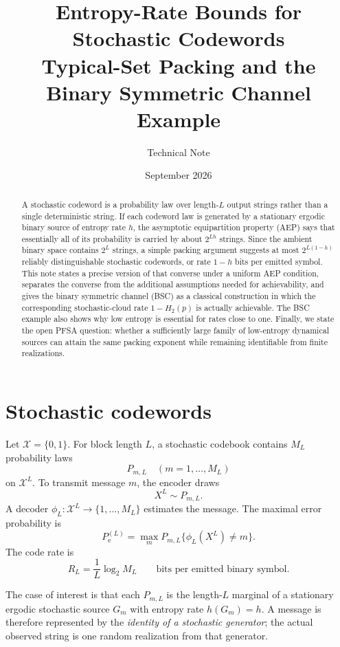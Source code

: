 \documentclass[11pt]{article}
\title{Entropy-Rate Bounds for Stochastic Codewords\\\large Typical-Set Packing and the Binary Symmetric Channel Example}
\author{Technical Note}
\date{September 2026}
\newcommand{\X}{\mathcal{X}}
\newcommand{\Pe}{P_{\mathrm e}}
\begin{document}
\maketitle

\begin{abstract}
A stochastic codeword is a probability law over length-$L$ output strings rather than a single deterministic string.  If each codeword law is generated by a stationary ergodic binary source of entropy rate $h$, the asymptotic equipartition property (AEP) says that essentially all of its probability is carried by about $2^{Lh}$ strings.  Since the ambient binary space contains $2^L$ strings, a simple packing argument suggests at most $2^{L(1-h)}$ reliably distinguishable stochastic codewords, or rate $1-h$ bits per emitted symbol.  This note states a precise version of that converse under a uniform AEP condition, separates the converse from the additional assumptions needed for achievability, and gives the binary symmetric channel (BSC) as a classical construction in which the corresponding stochastic-cloud rate $1-H_2(p)$ is actually achievable.  The BSC example also shows why low entropy is essential for rates close to one.  Finally, we state the open PFSA question: whether a sufficiently large family of low-entropy dynamical sources can attain the same packing exponent while remaining identifiable from finite realizations.
\end{abstract}

\section{Stochastic codewords}
Let $\X=\{0,1\}$.  For block length $L$, a stochastic codebook contains $M_L$ probability laws
\[
P_{m,L}\quad (m=1,\ldots,M_L)
\]
on $\X^L$.  To transmit message $m$, the encoder draws
\[
X^L\sim P_{m,L}.
\]
A decoder $\phi_L:\X^L\to\{1,\ldots,M_L\}$ estimates the message.  The maximal error probability is
\[
\Pe^{(L)}=\max_m P_{m,L}\{\phi_L(X^L)\neq m\}.
\]
The code rate is
\[
R_L=\frac{1}{L}\log_2 M_L\qquad\text{bits per emitted binary symbol}.
\]

The case of interest is that each $P_{m,L}$ is the length-$L$ marginal of a stationary ergodic stochastic source $G_m$ with entropy rate $h(G_m)=h$.  A message is therefore represented by the \emph{identity of a stochastic generator}; the actual observed string is one random realization from that generator.
\end{document}
